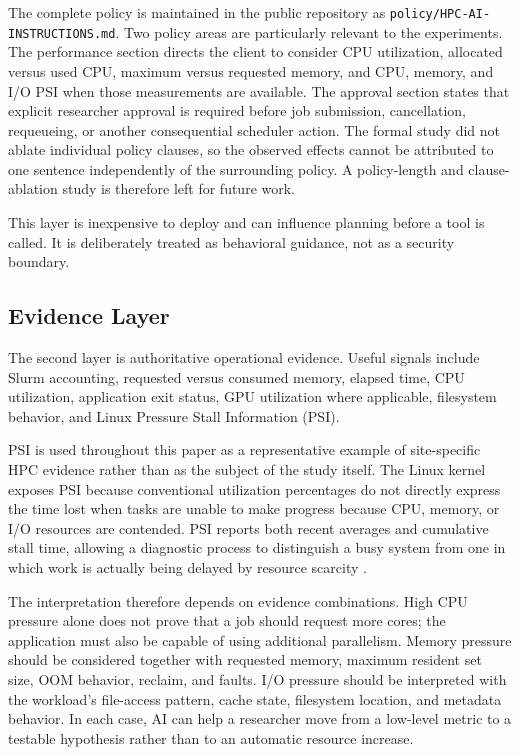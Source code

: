 \documentclass[11pt]{article}
\begin{document}
The complete policy is maintained in the public repository as \texttt{policy/HPC-AI-INSTRUCTIONS.md}. Two policy areas are particularly relevant to the experiments. The performance section directs the client to consider CPU utilization, allocated versus used CPU, maximum versus requested memory, and CPU, memory, and I/O PSI when those measurements are available. The approval section states that explicit researcher approval is required before job submission, cancellation, requeueing, or another consequential scheduler action. The formal study did not ablate individual policy clauses, so the observed effects cannot be attributed to one sentence independently of the surrounding policy. A policy-length and clause-ablation study is therefore left for future work.

This layer is inexpensive to deploy and can influence planning before a tool is called. It is deliberately treated as behavioral guidance, not as a security boundary.

\subsection{Evidence Layer}

The second layer is authoritative operational evidence. Useful signals include Slurm accounting, requested versus consumed memory, elapsed time, CPU utilization, application exit status, GPU utilization where applicable, filesystem behavior, and Linux Pressure Stall Information (PSI).

PSI is used throughout this paper as a representative example of site-specific HPC evidence rather than as the subject of the study itself. The Linux kernel exposes PSI because conventional utilization percentages do not directly express the time lost when tasks are unable to make progress because CPU, memory, or I/O resources are contended. PSI reports both recent averages and cumulative stall time, allowing a diagnostic process to distinguish a busy system from one in which work is actually being delayed by resource scarcity \citep{linuxpsi}.


The interpretation therefore depends on evidence combinations. High CPU pressure alone does not prove that a job should request more cores; the application must also be capable of using additional parallelism. Memory pressure should be considered together with requested memory, maximum resident set size, OOM behavior, reclaim, and faults. I/O pressure should be interpreted with the workload's file-access pattern, cache state, filesystem location, and metadata behavior. In each case, AI can help a researcher move from a low-level metric to a testable hypothesis rather than to an automatic resource increase.
\end{document}
